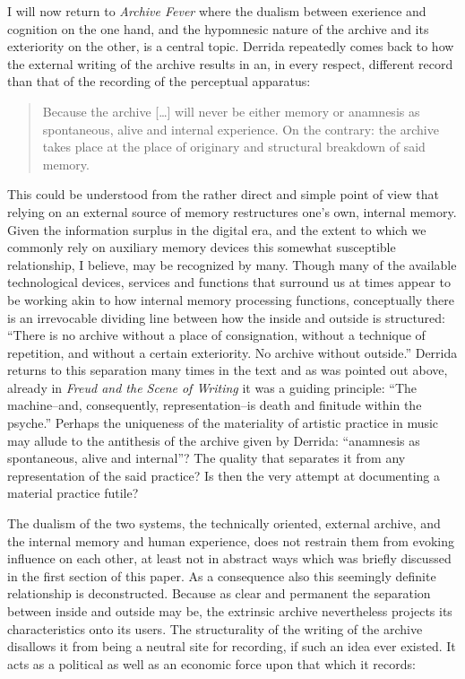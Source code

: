 \documentclass[11pt,a4paper]{article}
\begin{document}
I will now return to \emph{Archive Fever} where the dualism between exerience and cognition on the one hand, and the hypomnesic nature of the archive and its exteriority on the other, is a central topic. Derrida repeatedly comes back to how the external writing of the archive results in an, in every respect, different record than that of the recording of the perceptual apparatus:
\begin{quote}
Because the archive [\ldots] will never be either memory or anamnesis as spontaneous, alive and internal experience. On the contrary: the archive takes place at the place of originary and structural breakdown of said memory. \citep[p. 11]{derrida1998}
\end{quote}
This could be understood from the rather direct and simple point of view that relying on an external source of memory restructures one's own, internal memory. Given the information surplus in the digital era, and the extent to which we commonly rely on auxiliary memory devices this somewhat susceptible relationship, I believe, may be recognized by many. Though many of the available technological devices, services and functions that surround us at times appear to be working akin to how internal memory processing functions, conceptually there is an irrevocable dividing line between how the inside and outside is structured: ``There is no archive without a place of consignation, without a technique of repetition, and without a certain exteriority. No archive without outside.'' \citep[p. 11]{derrida1998} Derrida returns to this separation many times in the text and as was pointed out above, already in \emph{Freud and the Scene of Writing} it was a guiding principle: ``The machine--and, consequently, representation--is death and finitude within the psyche.'' \citep[p. 286]{der78} Perhaps the uniqueness of the materiality of artistic practice in music may allude to the antithesis of the archive given by Derrida: ``anamnesis as spontaneous, alive and internal''? The quality that separates it from any representation of the said practice?
Is then the very attempt at documenting a material practice futile?

The dualism of the two systems, the technically oriented, external archive, and the internal memory and human experience, does not restrain them from evoking influence on each other, at least not in abstract ways which was briefly discussed in the first section of this paper. As a consequence also this seemingly definite relationship is deconstructed. Because as clear and permanent the separation between inside and outside may be, the extrinsic archive nevertheless projects its characteristics onto its users. The structurality of the writing of the archive disallows it from being a neutral site for recording, if such an idea ever existed. It acts as a political as well as an economic force upon that which it records:
\end{document}
